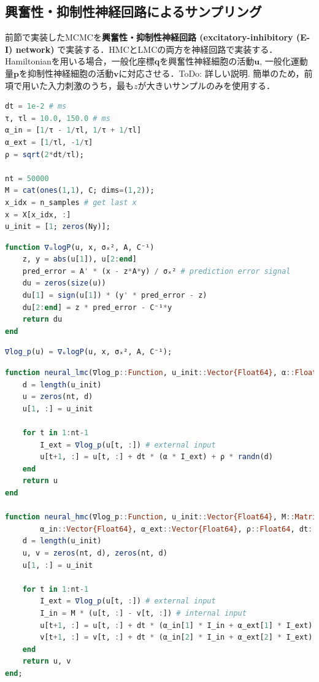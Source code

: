 \subsection{興奮性・抑制性神経回路によるサンプリング}
前節で実装したMCMCを\textbf{興奮性・抑制性神経回路 (excitatory-inhibitory (E-I) network)} で実装する．HMCとLMCの両方を神経回路で実装する．
Hamiltonianを用いる場合，一般化座標$\mathbf{q}$を興奮性神経細胞の活動$\mathbf{u}$, 一般化運動量$\mathbf{p}$を抑制性神経細胞の活動$\mathbf{v}$に対応させる．ToDo: 詳しい説明.
簡単のため，前項で用いた入力刺激のうち，最も$z$が大きいサンプルのみを使用する．
\begin{lstlisting}[language=julia]
dt = 1e-2 # ms
τ, τl = 10.0, 150.0 # ms
α_in = [1/τ - 1/τl, 1/τ + 1/τl]
α_ext = [1/τl, -1/τ]
ρ = sqrt(2*dt/τl);

nt = 50000
M = cat(ones(1,1), C; dims=(1,2));
x_idx = n_samples # get last x
x = X[x_idx, :]
u_init = [1; zeros(Ny)];
\end{lstlisting}
\begin{lstlisting}[language=julia]
function ∇ᵤlogP(u, x, σₓ², A, C⁻¹)
    z, y = abs(u[1]), u[2:end]
    pred_error = A' * (x - z*A*y) / σₓ² # prediction error signal
    du = zeros(size(u))
    du[1] = sign(u[1]) * (y' * pred_error - z)
    du[2:end] = z * pred_error - C⁻¹*y
    return du
end
\end{lstlisting}
\begin{lstlisting}[language=julia]
∇log_p(u) = ∇ᵤlogP(u, x, σₓ², A, C⁻¹);
\end{lstlisting}
\begin{lstlisting}[language=julia]
function neural_lmc(∇log_p::Function, u_init::Vector{Float64}, α::Float64, ρ::Float64, dt::Float64, nt::Int)
    d = length(u_init)
    u = zeros(nt, d)
    u[1, :] = u_init

    for t in 1:nt-1
        I_ext = ∇log_p(u[t, :]) # external input
        u[t+1, :] = u[t, :] + dt * (α * I_ext) + ρ * randn(d) 
    end
    return u
end

function neural_hmc(∇log_p::Function, u_init::Vector{Float64}, M::Matrix{Float64}, 
        α_in::Vector{Float64}, α_ext::Vector{Float64}, ρ::Float64, dt::Float64, nt::Int)
    d = length(u_init)
    u, v = zeros(nt, d), zeros(nt, d)
    u[1, :] = u_init

    for t in 1:nt-1
        I_ext = ∇log_p(u[t, :]) # external input
        I_in = M * (u[t, :] - v[t, :]) # internal input
        u[t+1, :] = u[t, :] + dt * (α_in[1] * I_in + α_ext[1] * I_ext) + ρ * randn(d) 
        v[t+1, :] = v[t, :] + dt * (α_in[2] * I_in + α_ext[2] * I_ext) + ρ * randn(d)
    end
    return u, v
end;
\end{lstlisting}

